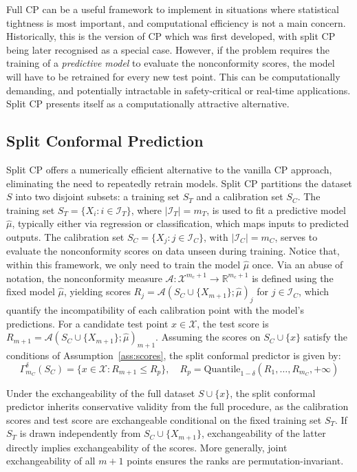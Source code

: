 Full CP can be a useful framework to implement in situations where statistical tightness is most important, and computational efficiency is not a main concern. Historically, this is the version of CP which was first developed, with split CP being later recognised as a special case. However, if the problem requires the training of a \textit{predictive model} to evaluate the nonconformity scores, the model will have to be retrained for every new test point. This can be computationally demanding, and potentially intractable in safety-critical or real-time applications. Split CP presents itself as a computationally attractive alternative.

\subsection{Split Conformal Prediction}

Split CP offers a numerically efficient alternative to the vanilla CP approach, eliminating the need to repeatedly retrain models. Split CP partitions the dataset $S$ into two disjoint subsets: a training set $S_T$ and a calibration set $S_C$. The training set $S_T = \{X_i : i \in \mathcal{I}_T\}$, where $|\mathcal{I}_T| = m_{T}$, is used to fit a predictive model $\hat{\mu}$, typically either via regression or classification, which maps inputs to predicted outputs. The calibration set $S_C = \{X_j : j \in \mathcal{I}_C\}$, with $|\mathcal{I}_C| = m_{C}$, serves to evaluate the nonconformity scores on data unseen during training. Notice that, within this framework, we only need to train the model $\hat{\mu}$ once. Via an abuse of notation, the nonconformity measure $\mathcal{A} : \mathcal{X}^{m_c +1} \to \mathbb{R}^{m_c +1}$ is defined using the fixed model $\hat{\mu}$, yielding scores $R_j = \mathcal{A}(S_C \cup \{X_{m+1}\}; \hat{\mu})_j$ for $j \in \mathcal{I}_C$, which quantify the incompatibility of each calibration point with the model's predictions. For a candidate test point $x \in \mathcal{X}$, the test score is $R_{m+1} = \mathcal{A}(S_C \cup \{X_{m+1}\}; \hat{\mu})_{m+1}$. Assuming the scores on $S_C \cup \{x\}$ satisfy the conditions of Assumption~\ref{ass:scores}, the split conformal predictor is given by:
\[
\Gamma^\delta_{m_C}(S_C) = \{ x \in \mathcal{X} : R_{m+1} \le R_p \}, \quad R_p = \mathrm{Quantile}_{1-\delta}(R_1, \ldots, R_{m_C}, +\infty)
\]

Under the exchangeability of the full dataset $S \cup \{x\}$, the split conformal predictor inherits conservative validity from the full procedure, as the calibration scores and test score are exchangeable conditional on the fixed training set $S_T$. If $S_T$ is drawn independently from $S_C \cup \{X_{m+1}\}$, exchangeability of the latter directly implies exchangeability of the scores. More generally, joint exchangeability of all $m+1$ points ensures the ranks are permutation-invariant.

